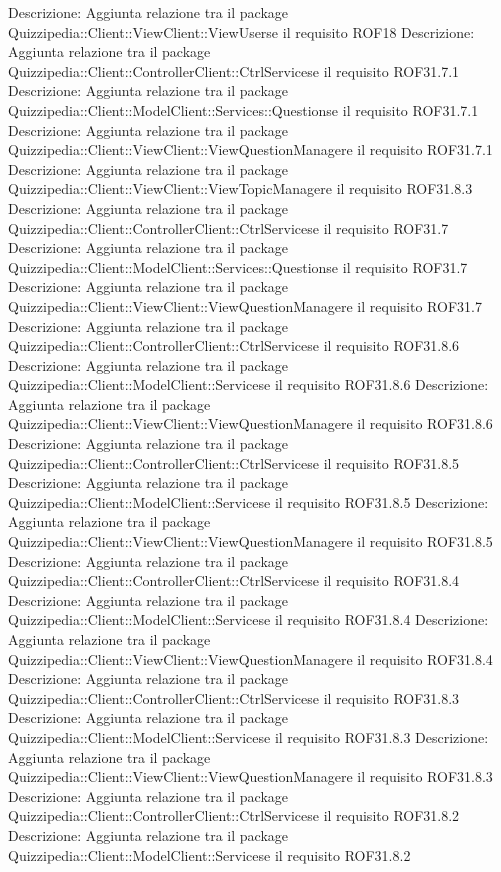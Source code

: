 Descrizione: Aggiunta relazione tra il package Quizzipedia::Client::ViewClient::ViewUserse il requisito ROF18 
Descrizione: Aggiunta relazione tra il package Quizzipedia::Client::ControllerClient::CtrlServicese il requisito ROF31.7.1 
Descrizione: Aggiunta relazione tra il package Quizzipedia::Client::ModelClient::Services::Questionse il requisito ROF31.7.1 
Descrizione: Aggiunta relazione tra il package Quizzipedia::Client::ViewClient::ViewQuestionManagere il requisito ROF31.7.1 
Descrizione: Aggiunta relazione tra il package Quizzipedia::Client::ViewClient::ViewTopicManagere il requisito ROF31.8.3 
Descrizione: Aggiunta relazione tra il package Quizzipedia::Client::ControllerClient::CtrlServicese il requisito ROF31.7 
Descrizione: Aggiunta relazione tra il package Quizzipedia::Client::ModelClient::Services::Questionse il requisito ROF31.7 
Descrizione: Aggiunta relazione tra il package Quizzipedia::Client::ViewClient::ViewQuestionManagere il requisito ROF31.7 
Descrizione: Aggiunta relazione tra il package Quizzipedia::Client::ControllerClient::CtrlServicese il requisito ROF31.8.6 
Descrizione: Aggiunta relazione tra il package Quizzipedia::Client::ModelClient::Servicese il requisito ROF31.8.6 
Descrizione: Aggiunta relazione tra il package Quizzipedia::Client::ViewClient::ViewQuestionManagere il requisito ROF31.8.6 
Descrizione: Aggiunta relazione tra il package Quizzipedia::Client::ControllerClient::CtrlServicese il requisito ROF31.8.5 
Descrizione: Aggiunta relazione tra il package Quizzipedia::Client::ModelClient::Servicese il requisito ROF31.8.5 
Descrizione: Aggiunta relazione tra il package Quizzipedia::Client::ViewClient::ViewQuestionManagere il requisito ROF31.8.5 
Descrizione: Aggiunta relazione tra il package Quizzipedia::Client::ControllerClient::CtrlServicese il requisito ROF31.8.4 
Descrizione: Aggiunta relazione tra il package Quizzipedia::Client::ModelClient::Servicese il requisito ROF31.8.4 
Descrizione: Aggiunta relazione tra il package Quizzipedia::Client::ViewClient::ViewQuestionManagere il requisito ROF31.8.4 
Descrizione: Aggiunta relazione tra il package Quizzipedia::Client::ControllerClient::CtrlServicese il requisito ROF31.8.3 
Descrizione: Aggiunta relazione tra il package Quizzipedia::Client::ModelClient::Servicese il requisito ROF31.8.3 
Descrizione: Aggiunta relazione tra il package Quizzipedia::Client::ViewClient::ViewQuestionManagere il requisito ROF31.8.3 
Descrizione: Aggiunta relazione tra il package Quizzipedia::Client::ControllerClient::CtrlServicese il requisito ROF31.8.2 
Descrizione: Aggiunta relazione tra il package Quizzipedia::Client::ModelClient::Servicese il requisito ROF31.8.2 
